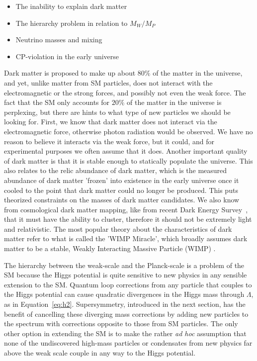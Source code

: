 \begin{itemize}
\item The inability to explain dark matter \cite{BERTONE2005279}
\item The hierarchy problem in relation to $M_W/M_P$
\item Neutrino masses and mixing \cite{1367-2630-16-4-045018, Fukuda:1998mi, Ahmad:2001an}
\item CP-violation in the early universe \cite{Sakharov:1967dj}
 \end{itemize}
Dark matter is proposed to make up about $80\%$ of the matter in the universe, and yet, unlike matter from SM particles, does not interact with the electromagnetic or the strong forces, and possibly not even the weak force.  The fact that the SM only accounts for $20\%$ of the matter in the universe is perplexing, but there are hints to what type of new particles we should be looking for.  First, we know that dark matter does not interact via the electromagnetic force, otherwise photon radiation would be observed.  We have no reason to believe it interacts via the weak force, but it could, and for experimental purposes we often assume that it does.  Another important quality of dark matter is that it is stable enough to statically populate the universe.  This also relates to the relic abundance of dark matter, which is the measured abundance of dark matter 'frozen' into existence in the early universe once it cooled to the point that dark matter could no longer be produced.  This puts theorized constraints on the masses of dark matter candidates.  We also know from cosmological dark matter mapping, like from recent Dark Energy Survey~\cite{surveydm}, that it must have the ability to cluster, therefore it should not be extremely light and relativistic.  The most popular theory about the characteristics of dark matter refer to what is called the 'WIMP Miracle', which broadly assumes dark matter to be a stable, Weakly Interacting Massive Particle (WIMP) \cite{Kilic:2010fs, McDonald:2012vw}.  %

The hierarchy between the weak-scale and the Planck-scale is a problem of the SM because the Higgs potential is quite sensitive to new physics in any sensible extension to the SM.  Quantum loop corrections from any particle that couples to the Higgs potential can cause quadratic divergences in the Higgs mass through $\Lambda$, as in Equation~\ref{eq:h2}.  Supersymmetry, introduced in the next section, has the benefit of cancelling these diverging mass corrections by adding new particles to the spectrum with corrections opposite to those from SM particles.  The only other option in extending the SM is to make the rather \textit{ad hoc} assumption that none of the undiscovered high-mass particles or condensates from new physics far above the weak scale couple in any way to the Higgs potential.  


